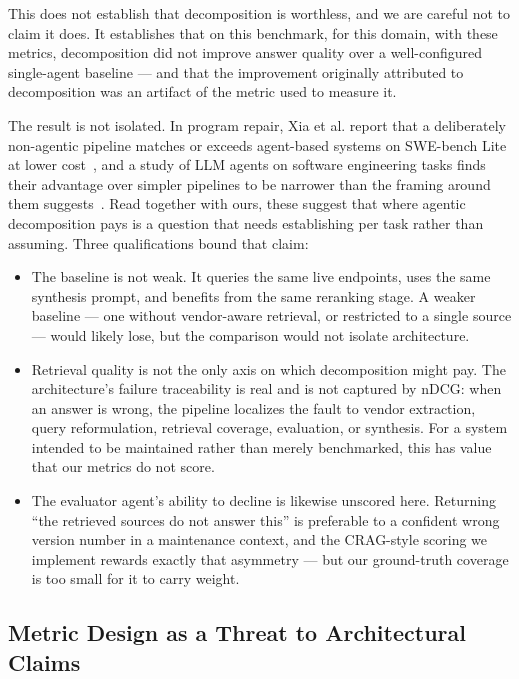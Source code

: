 \documentclass[acmsmall,review,anonymous,screen]{acmart}
\begin{document}
This does not establish that decomposition is worthless, and we are careful not
to claim it does. It establishes that on this benchmark, for this domain, with
these metrics, decomposition did not improve answer quality over a
well-configured single-agent baseline --- and that the improvement originally
attributed to decomposition was an artifact of the metric used to measure it.

The result is not isolated. In program repair, Xia et al. report that a
deliberately non-agentic pipeline matches or exceeds agent-based systems on
SWE-bench Lite at lower cost~\cite{xia2025agentless}, and a study of LLM agents on
software engineering tasks finds their advantage over simpler pipelines to be
narrower than the framing around them
suggests~\cite{wang2024rocks}. Read together with ours, these
suggest that where agentic decomposition pays is a question that needs
establishing per task rather than assuming.
Three qualifications bound that claim:

\begin{itemize}
  \item The baseline is not weak. It queries the same live endpoints, uses the
  same synthesis prompt, and benefits from the same reranking stage. A weaker
  baseline --- one without vendor-aware retrieval, or restricted to a single
  source --- would likely lose, but the comparison would not isolate
  architecture.

  \item Retrieval quality is not the only axis on which decomposition might pay.
  The architecture's failure traceability is real and is not captured by nDCG:
  when an answer is wrong, the pipeline localizes the fault to vendor
  extraction, query reformulation, retrieval coverage, evaluation, or synthesis.
  For a system intended to be maintained rather than merely benchmarked, this
  has value that our metrics do not score.

  \item The evaluator agent's ability to decline is likewise unscored here.
  Returning ``the retrieved sources do not answer this'' is preferable to a
  confident wrong version number in a maintenance context, and the CRAG-style
  scoring we implement rewards exactly that asymmetry --- but our ground-truth
  coverage is too small for it to carry weight.
\end{itemize}

\subsection{Metric Design as a Threat to Architectural Claims}
\label{sec:metric-threat}
\end{document}
